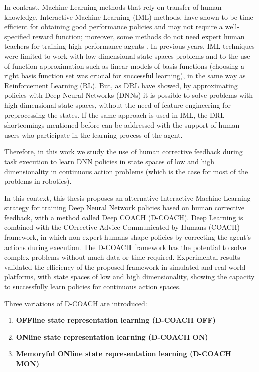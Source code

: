 In contrast, Machine Learning methods that rely on transfer of human knowledge, Interactive Machine Learning (IML) methods, have shown to be time efficient for obtaining good performance policies and may not require a well-specified reward function; moreover, some methods do not need expert human teachers for training high performance agents \cite{akrour2011preference,Knox:2009:ISA:1597735.1597738,Celemin2018AnInteractive}. In previous years, IML techniques were limited to work with low-dimensional state spaces problems and to the use of function approximation such as linear models of basis functions (choosing a right basis function set was crucial for successful learning), in the same way as Reinforcement Learning (RL). But, as DRL have showed, by approximating policies with Deep Neural Networks (DNNs) it is possible to solve problems with high-dimensional state spaces, without the need of feature engineering for preprocessing the states. If the same approach is used in IML, the DRL shortcomings mentioned before can be addressed with the support of human users who participate in the learning process of the agent.

Therefore, in this work we study the use of human corrective feedback during task execution to learn DNN policies in state spaces of low and high dimensionality in continuous action problems (which is the case for most of the problems in robotics).

In this context, this thesis proposes an alternative Interactive Machine Learning strategy for training Deep Neural Network policies based on human corrective feedback, with a method called Deep COACH (D-COACH). Deep Learning is combined with the COrrective Advice Communicated by Humans (COACH) framework, in which non-expert humans shape policies by correcting the agent’s actions during execution. The D-COACH framework has the potential to solve complex problems without much data or time required. Experimental results validated the efficiency of the proposed framework in simulated and real-world platforms, with state spaces of low and high dimensionality, showing the capacity to successfully learn policies for continuous action spaces. 

Three variations of D-COACH are introduced:

\begin{enumerate}
    \item \textbf{OFFline state representation learning (D-COACH OFF)}
    \item \textbf{ONline state representation learning (D-COACH ON)}
    \item \textbf{Memoryful ONline state representation learning (D-COACH MON)}
\end{enumerate}

